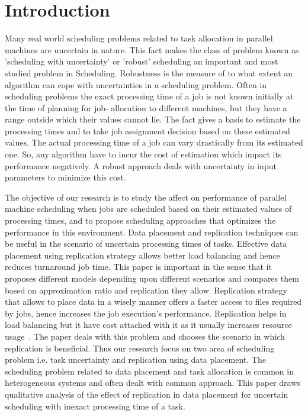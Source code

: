 \documentclass[10pt, conference, compsocconf]{IEEEtran}
\begin{document}
\section{Introduction}

Many real world scheduling problems related to task allocation in parallel machines are uncertain in nature. This fact makes the class of problem known as ’scheduling with uncertainty’ or ’robust’ scheduling an important and most studied problem in Scheduling. Robustness is the measure of to what extent an algorithm can cope with uncertainties in a scheduling problem. Often in scheduling problems the exact processing time of a job is not known initially at the time of planning for job- allocation to different machines, but they have a range outside which their values cannot lie. The fact gives a basis to estimate the processing times and to take job assignment decision based on these estimated values. The actual processing time of a job can vary drastically from its estimated one. So, any algorithm have to incur the cost of estimation which impact its performance negatively. A robust approach deals with uncertainty in input parameters to minimize this cost.

 The objective of our research is to study the affect on performance of parallel machine scheduling when jobs are scheduled based on their estimated values of processing times, and to propose scheduling approaches that optimizes the performance in this environment. Data  placement and replication techniques can be useful in the scenario of uncertain processing times of tasks. Effective data placement using replication strategy allows better load balancing and hence reduces turnaround job time. This paper is important in the sense that it proposes different models depending upon different scenarios and compares them based on approximation ratio and replication they allow. Replication strategy that allows to place data in a wisely manner offers a faster access to files required by jobs, hence increases the job execution’s performance. Replication helps in load balancing but it have cost attached with it as it usually increases resource usage~\cite{DBLP:journals/corr/WangJW14}. The paper deals with this problem and chooses the scenario in which replication is beneficial. Thus our research focus on two area of scheduling problem i.e. task uncertainty and replication using data placement. The scheduling problem related to data placement and task allocation is common in heterogeneous systems and often dealt with common approach. This paper draws qualitative analysis of the effect of replication in data placement for uncertain scheduling with inexact processing time of a task.
\end{document}
